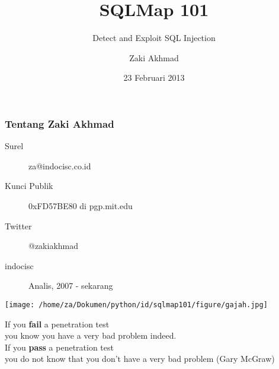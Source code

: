 \documentclass[xcolor=pdftex,table,10pt]{beamer}
\begin{document}
\title{SQLMap 101}
\subtitle{Detect and Exploit SQL Injection}
\author{Zaki Akhmad}
\date{23 Februari 2013}

\begin{frame}
	\titlepage
\end{frame}

\begin{frame}
	\frametitle{Tentang Zaki Akhmad}
		\begin{description}
			\item[Surel] za@indocisc.co.id 
			\item[Kunci Publik] 0xFD57BE80 di pgp.mit.edu
			\item[Twitter] @zakiakhmad	
			\item[indocisc] Analis, 2007 - sekarang
		\end{description}
	\begin{flushleft}
		\texttt{[image: /home/za/Dokumen/python/id/sqlmap101/figure/gajah.jpg]}
			\end{flushleft}
\end{frame}

\begin{frame}
	\begin{center}
		If you \textbf{fail} a penetration test \\ you know you have a very bad problem indeed. \\ If you \textbf{pass} a penetration test \\ you do not know that you don't have a very bad problem (Gary McGraw)
	\end{center}
\end{frame}
\end{document}
